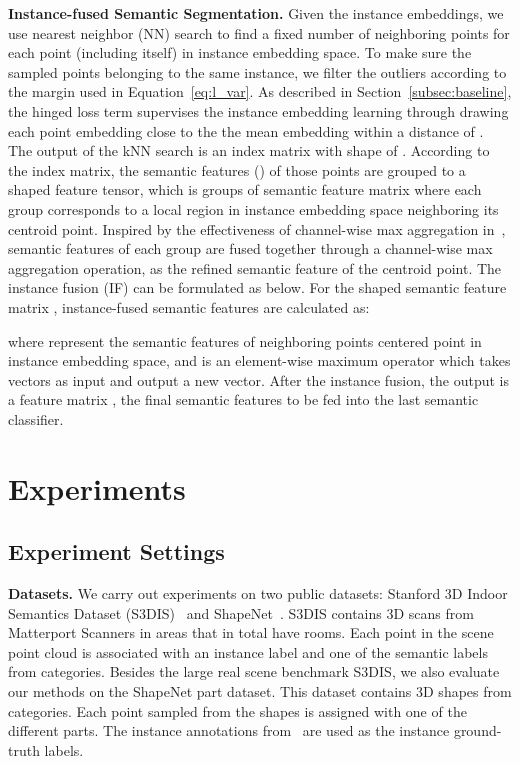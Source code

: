 \documentclass[10pt,twocolumn,letterpaper]{article}
\newcommand{\myparagraph}[1]{{\vspace{0.5em} \noindent \bf #1}}
\begin{document}
\myparagraph{Instance-fused Semantic Segmentation.}
Given the instance embeddings, we use  nearest neighbor (NN) search to find a fixed number of neighboring points for each point (including itself) in instance embedding space. 
To make sure the  sampled points belonging to the same instance, 
we filter the outliers according to the margin  used in Equation~\ref{eq:l_var}.
As described in Section~\ref{subsec:baseline}, the hinged loss term  supervises the instance embedding learning through drawing each point embedding close to the the mean embedding within a distance of .
The output of the kNN search is an index matrix with shape of .
According to the index matrix, the semantic features () of those points are grouped to a  shaped feature tensor, which is groups of semantic feature matrix where each group corresponds to a local region in instance embedding space neighboring its centroid point.
Inspired by the effectiveness of channel-wise max aggregation in~\cite{Qi_2017_CVPR,dgcnn,Ye_2018_ECCV}, semantic features of each group are fused together through a channel-wise max aggregation operation, as the refined semantic feature of the centroid point.
The instance fusion (IF) can be formulated as below. For the  shaped semantic feature matrix , instance-fused semantic features are calculated as:

where  represent the semantic features of  neighboring points centered point  in instance embedding space, and  is an element-wise maximum operator which takes  vectors as input and output a new vector. 
After the instance fusion, the output is a  feature matrix , the final semantic features to be fed into the last semantic classifier.


\section{Experiments}

\subsection{Experiment Settings}
\myparagraph{Datasets.}
We carry out experiments on two public datasets: Stanford 3D Indoor Semantics Dataset (S3DIS)~\cite{s3dis} and ShapeNet~\cite{shapenet}. 
S3DIS contains 3D scans from Matterport Scanners in  areas that in total have  rooms.
Each point in the scene point cloud is associated with an instance label and one of the semantic labels from  categories.
Besides the large real scene benchmark S3DIS, we also evaluate our methods on the ShapeNet part dataset.
This dataset contains  3D shapes from  categories. Each point sampled from the shapes is assigned with one of the  different parts. The instance annotations from~\cite{sgpn} are used as the instance ground-truth labels.
\end{document}
